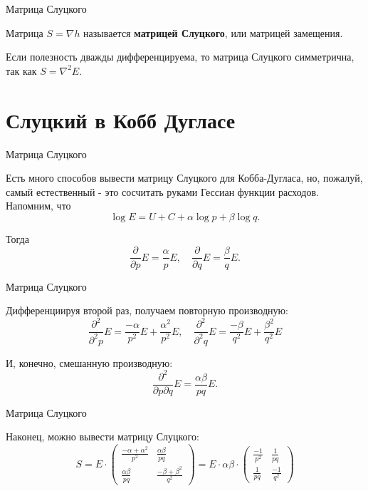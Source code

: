 \documentclass{beamer}
\begin{document}
\begin{frame}{Матрица Слуцкого}

\begin{definition}
Матрица $S = \nabla h$ называется \textbf{матрицей Слуцкого}, или матрицей замещения.
\end{definition}

\begin{lemma}
Если полезность дважды дифференцируема, то матрица Слуцкого симметрична, так как $S = \nabla^2 E$.
\end{lemma}

\end{frame}

\section{Слуцкий в Кобб Дугласе}

\begin{frame}{Матрица Слуцкого}

Есть много способов вывести матрицу Слуцкого для Кобба-Дугласа, но, пожалуй, самый естественный - это сосчитать руками Гессиан функции расходов. Напомним, что
$$ \log E = U + C + \alpha \log p + \beta \log q.$$

Тогда 
$$ \frac{\partial}{\partial p} E = \frac{\alpha}{p} E, \quad \frac{\partial}{\partial q} E = \frac{\beta}{q} E.$$

\end{frame}

\begin{frame}{Матрица Слуцкого}

Дифференциируя второй раз, получаем повторную производную:
$$ \frac{\partial^2}{\partial^2 p} E = \frac{-\alpha}{p^2} E + \frac{\alpha^2}{p^2} E, \quad \frac{\partial^2}{\partial^2 q} E = \frac{-\beta}{q^2} E + \frac{\beta^2}{q^2} E$$

И, конечно, смешанную производную:
$$ \frac{\partial^2}{\partial p \partial q} E = \frac{\alpha \beta}{p q} E.$$

\end{frame}

\begin{frame}{Матрица Слуцкого}

Наконец, можно вывести матрицу Слуцкого:
$$ S = 
E \cdot 
\begin{pmatrix} 
\frac{-\alpha + \alpha^2}{p^2} & \frac{\alpha \beta}{p q} \\
\frac{\alpha \beta}{p q} & \frac{-\beta +\beta^2}{q^2}
\end{pmatrix} = 
E \cdot \alpha \beta \cdot
\begin{pmatrix} 
\frac{-1}{p^2} & \frac{1}{p q} \\
\frac{1}{p q} & \frac{-1}{q^2}
\end{pmatrix}
$$
\end{frame}
\end{document}
